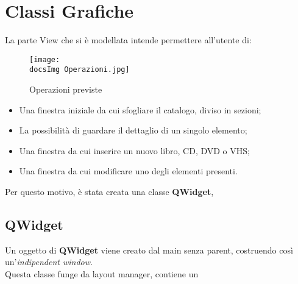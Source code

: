 \section{Classi Grafiche}{
	La parte View che si è modellata intende permettere all'utente di:

	\begin{figure}[h]
			\begin{center}
				\texttt{[image: \\docsImg Operazioni.jpg]}
				\caption{Operazioni previste}
			\end{center}
	\end{figure}
	\begin{itemize}\itemsep=0.5pt
		\item Una finestra iniziale da cui sfogliare il catalogo, diviso in sezioni;
		\item La possibilità di guardare il dettaglio di un singolo elemento;
        \item Una finestra da cui inserire un nuovo libro, CD, DVD o VHS;
		\item Una finestra da cui modificare uno degli elementi presenti.
	\end{itemize}
	Per questo motivo, è stata creata una classe \textbf{QWidget},
	\subsection{QWidget}{
		Un oggetto di \textbf{QWidget} viene creato dal main senza parent, costruendo così un'\textit{indipendent window}. \\
		Questa classe funge da layout manager, contiene un 
	}
}